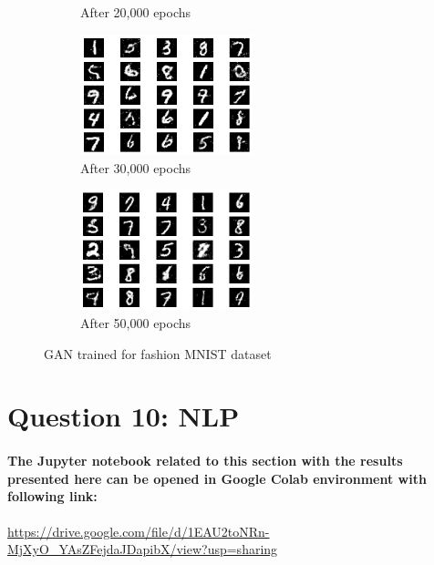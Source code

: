 \documentclass[a4paper]{article}    %
\begin{document}
\begin{figure}[H]
\begin{subfigure}{0.32\textwidth}
        \caption{After 20,000 epochs}
        \label{fig:fashion_mnist-epoch20000}
    \end{subfigure}
    \hfill
    \begin{subfigure}{0.32\textwidth}
        \centering
        \includegraphics[width=5cm]{30000}
        \caption{After 30,000 epochs}
        \label{fig:fashion_mnist-epoch30000}
    \end{subfigure}
    \hfill
    \begin{subfigure}{0.32\textwidth}
        \centering
        \includegraphics[width=5cm]{50000}
        \caption{After 50,000 epochs}
        \label{fig:fashion_mnist-epoch50000}
    \end{subfigure}
    \caption{GAN trained for fashion MNIST dataset} 
    \label{fig:gan-fashion_mnist}
\end{figure}

\newpage
\section{Question 10: NLP}

\paragraph{The Jupyter notebook related to this section with the results presented here can be opened in Google Colab environment with following link:\\}

\href{https://drive.google.com/file/d/1EAU2toNRn-MjXyO_YAsZFejdaJDapibX/view?usp=sharing}{https://drive.google.com/file/d/1EAU2toNRn-MjXyO\_YAsZFejdaJDapibX/view?usp=sharing}
\end{document}
